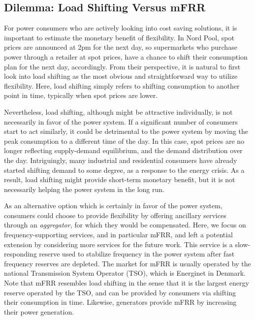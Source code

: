\documentclass[11pt,a4paper]{article}
\begin{document}
\subsection{Dilemma: Load Shifting Versus mFRR}
%
For power consumers who are actively looking into cost saving solutions, it is important to estimate the monetary benefit of flexibility. In Nord Pool, spot prices are announced at 2pm for the next day, so supermarkets who purchase power through a retailer at  spot prices, have a chance to shift their consumption plan for the next day, accordingly. From their perspective, it is natural to first look into load shifting as the most obvious and straightforward way to utilize flexibility. Here, load shifting simply refers to shifting consumption to another point in time, typically when spot prices are lower.

Nevertheless, load shifting, although might be attractive individually, is not necessarily in  favor of the power system.
If a significant number of consumers start to act similarly, it could be detrimental to the power system by moving the peak consumption to a different time of the day. In this case, spot prices are no longer reflecting supply-demand equilibrium, and the demand distribution over the day.
Intriguingly, many industrial and residential consumers have already started shifting demand to some degree, as a response to the energy crisis.
As a result, load shifting might provide short-term monetary benefit, but it is not necessarily helping the power system in the long run.

As an alternative option which is certainly in favor of the power system, consumers could choose to provide flexibility by offering ancillary services through an \textit{aggregator}, for which they would be compensated. Here, we focus on frequency-supporting services, and in particular mFRR, and left a potential extension by considering more services for the future work. This service is a slow-responding reserve used to stabilize frequency in the power system after fast frequency reserves are depleted. The market for mFRR is usually operated by the national Transmission System Operator (TSO), which is Energinet in Denmark. Note that mFRR resembles load shifting in the sense that it is the largest energy reserve operated by the TSO, and can be provided by consumers via shifting their consumption in time. Likewise, generators provide mFRR by increasing their power generation.
\end{document}
